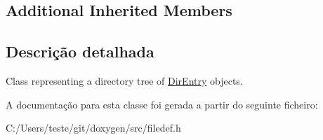 \subsection*{Additional Inherited Members}


\subsection{Descrição detalhada}
Class representing a directory tree of \hyperlink{class_dir_entry}{Dir\-Entry} objects. 

A documentação para esta classe foi gerada a partir do seguinte ficheiro\-:\begin{DoxyCompactItemize}
\item 
C\-:/\-Users/teste/git/doxygen/src/filedef.\-h\end{DoxyCompactItemize}

